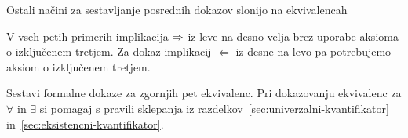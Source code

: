 Ostali načini za sestavljanje posrednih dokazov slonijo na
ekvivalencah
%
%
V vseh petih primerih implikacija $\Rightarrow$ iz leve na desno velja brez
uporabe aksioma o izključenem tretjem. Za dokaz implikacij
$\Leftarrow$ iz desne na levo pa potrebujemo aksiom o izključenem
tretjem.

\begin{vaja}
  Sestavi formalne dokaze za zgornjih pet ekvivalenc. Pri dokazovanju
  ekvivalenc za $\forall$ in $\exists$ si pomagaj s pravili sklepanja
  iz razdelkov~\ref{sec:univerzalni-kvantifikator}
  in~\ref{sec:eksistencni-kvantifikator}.
\end{vaja}


